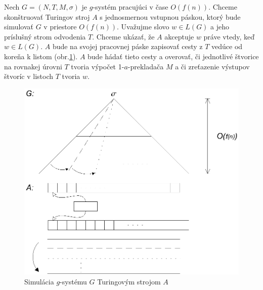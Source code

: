 \begin{dokaz}
  Nech $G=(N,T,M,\sigma)$ je $g$-systém pracujúci v čase $O(f(n))$.
  Chceme skonštruovať Turingov stroj $A$ s jednosmernou vstupnou
  páskou, ktorý bude simulovať $G$ v priestore $O(f(n))$. Uvažujme
  slovo $w\in L(G)$ a jeho príslušný strom odvodenia $T$. Chceme
  ukázať, že $A$ akceptuje $w$ práve vtedy, keď $w\in L(G)$.  $A$
  bude na svojej pracovnej páske zapisovať cesty z $T$ vedúce od
  koreňa k listom (obr.\ref{gs_obr_nspace}). $A$ bude hádať tieto cesty a
  overovať, či jednotlivé štvorice na rovnakej úrovni $T$ tvoria
  výpočet 1-$a$-prekladača $M$ a či zreťazenie výstupov štvoríc v
  listoch $T$ tvoria $w$.

  \begin{figure}[!ht]
  \centering
  \includegraphics{img/gsystems/nspace}
  \caption{Simulácia $g$-systému $G$ Turingovým strojom $A$}
  \label{gs_obr_nspace}
  \end{figure}


\end{dokaz}
